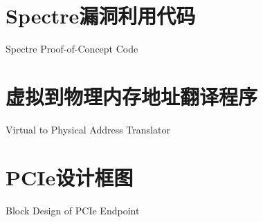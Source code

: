 \documentclass[degree=undergraduate,bibstyle=numerical,font=empty]{xmuthesis}
\begin{document}
\maketitle


\xmutableofcontents %




\nocite{*} 

\appendix
\chapter{Spectre漏洞利用代码}{Spectre Proof-of-Concept Code} \label{app:spectre-code}


\chapter{虚拟到物理内存地址翻译程序}{Virtual to Physical Address Translator} \label{app:v2p}


\chapter{PCIe设计框图}{Block Design of PCIe Endpoint} \label{app:pcie-ep}
\end{document}
